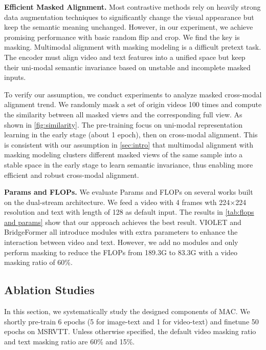 \documentclass[10pt,twocolumn,letterpaper]{article}
\begin{document}
 
\vspace{1mm}\noindent\textbf{Efficient Masked Alignment.} Most contrastive methods rely on heavily strong data augmentation techniques \cite{randaugment, cutout} to significantly change the visual appearance but keep the semantic meaning unchanged. However, in our experiment, we achieve promising performance with basic random flip and crop. We find the key is masking. Multimodal alignment with masking modeling is a difficult pretext task. The encoder must align video and text features into a unified space but keep their uni-modal semantic invariance based on unstable and incomplete masked inputs. 

To verify our assumption, we conduct experiments to analyze masked cross-modal alignment trend. We randomly mask a set of origin videos 100 times and compute the similarity between all masked views and the corresponding full view. As shown in \cref{fig:similarity}. The pre-training focus on uni-modal representation learning in the early stage (about 1 epoch), then on cross-modal alignment. This is consistent with our assumption in \cref{sec:intro} that multimodal alignment with masking modeling clusters different masked views of the same sample into a stable space in the early stage to learn semantic invariance, thus enabling more efficient and robust cross-modal alignment.

\vspace{1mm}\noindent\textbf{Params and FLOPs.} We evaluate Params and FLOPs on several works built on the dual-stream architecture. We feed a video with 4 frames wth 224$\times$224 resolution and text with length of 128 as default input. The results in \cref{tab:flops and params} show that our approach achieves the best result. VIOLET and BridgeFormer all introduce modules with extra parameters to enhance the interaction between video and text. However, we add no modules and only perform masking to reduce the FLOPs from 189.3G to 83.3G with a video masking ratio of 60\%.






\vspace{-1mm}\subsection{Ablation Studies}\vspace{-1mm}
\label{sec:abalations}
In this section, we systematically study the designed components of MAC. We shortly pre-train 6 epochs (5 for image-text and 1 for video-text) and finetune 50 epochs on MSRVTT. Unless otherwise specified, the default video masking ratio and text masking ratio are 60\% and 15\%.
\end{document}
